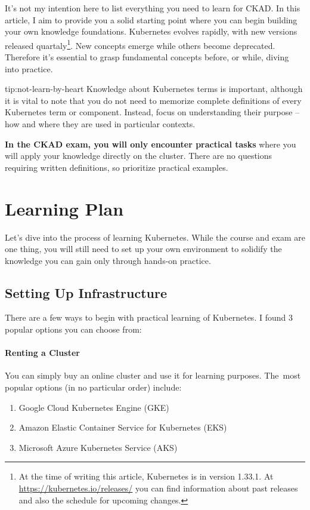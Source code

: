 It's not my intention here to list everything you need to learn for CKAD. In this article, I aim to provide you a solid starting point where you can begin building your own knowledge foundations. Kubernetes evolves rapidly, with new versions released quartaly\footnote{At the time of writing this article, Kubernetes is in version 1.33.1. At \url{https://kubernetes.io/releases/} you can find information about past releases and also the schedule for upcoming changes.}. New concepts emerge while others become deprecated. Therefore it's essential to grasp fundamental concepts before, or while, diving into practice.

\begin{tip}{tip:not-learn-by-heart}
	Knowledge about Kubernetes terms is important, although it is vital to note that you do not need to memorize complete definitions of every Kubernetes term or component. Instead, focus on understanding their purpose -- how and where they are used in particular contexts.  
	
	\textbf{In the CKAD exam, you will only encounter practical tasks} where you will apply your knowledge directly on the cluster. There are no questions requiring written definitions, so prioritize practical examples.
\end{tip}

\section{Learning Plan}

Let's dive into the process of learning Kubernetes. While the course and exam are one thing, you will still need to set up your own environment to solidify the knowledge you can gain only through hands-on practice.

\subsection{Setting Up Infrastructure}
\label{subsec:setting-up-infrastructure}

There are a few ways to begin with practical learning of Kubernetes. I found 3 popular options you can choose from:

\paragraph{Renting a Cluster} You can simply buy an online cluster and use it for learning purposes. The~most popular options (in no particular order) include:
\begin{enumerate}
	\item Google Cloud Kubernetes Engine (GKE)
	\item Amazon Elastic Container Service for Kubernetes (EKS)
	\item Microsoft Azure Kubernetes Service (AKS)
\end{enumerate}

